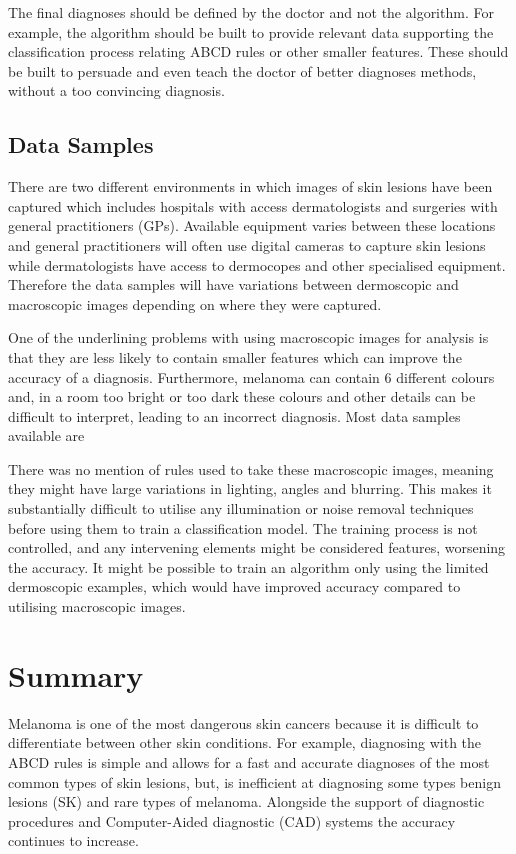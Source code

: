 \documentclass[12pt]{report}
\begin{document}
The final diagnoses should be defined by the doctor and not the algorithm. For example, the algorithm should be built to provide relevant data supporting the classification process relating ABCD rules or other smaller features. These should be built to persuade and even teach the doctor of better diagnoses methods, without a too convincing diagnosis.

\subsection{Data Samples}
There are two different environments in which images of skin lesions have been captured which includes hospitals with access dermatologists and surgeries with general practitioners (GPs). Available equipment varies between these locations and general practitioners will often use digital cameras to capture skin lesions while dermatologists have access to dermocopes and other specialised equipment. Therefore the data samples will have variations between dermoscopic and macroscopic images depending on where they were captured.

One of the underlining problems with using macroscopic images for analysis is that they are less likely to contain smaller features which can improve the accuracy of a diagnosis\cite{}. Furthermore, melanoma can contain 6 different colours and, in a room too bright or too dark these colours and other details can be difficult to interpret, leading to an incorrect diagnosis. Most data samples available are

There was no mention of rules used to take these macroscopic images, meaning they might have large variations in lighting, angles and blurring. This makes it substantially difficult to utilise any illumination or noise removal techniques before using them to train a classification model. The training process is not controlled, and any intervening elements might be considered features, worsening the accuracy. It might be possible to train an algorithm only using the limited dermoscopic examples, which would have improved accuracy \cite{Holmes2018} compared to utilising macroscopic images.

\section{Summary}
Melanoma is one of the most dangerous skin cancers because it is difficult to differentiate between other skin conditions. For example, diagnosing with the ABCD rules is simple and allows for a fast and accurate diagnoses of the most common types of skin lesions, but, is inefficient at diagnosing some types benign lesions (SK) and rare types of melanoma\cite{Carrera2017}. Alongside the support of diagnostic procedures and Computer-Aided diagnostic (CAD) systems the accuracy continues to increase.
\end{document}
